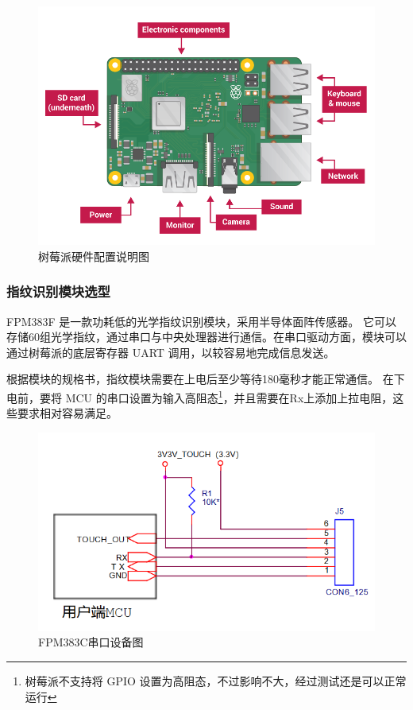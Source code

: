 \begin{figure}[ht]
    \centering
    \includegraphics[width=\textwidth]{imgs/树莓派硬件配置说明图.png}
    \caption{树莓派硬件配置说明图}    \label{树莓派硬件配置说明图}
\end{figure}

\subsubsection{指纹识别模块选型}

FPM383F 是一款功耗低的光学指纹识别模块，采用半导体面阵传感器。
它可以存储60组光学指纹，通过串口与中央处理器进行通信。在串口驱动方面，模块可以通过树莓派的底层寄存器 UART 调用，以较容易地完成信息发送。

根据模块的规格书，指纹模块需要在上电后至少等待180毫秒才能正常通信。
在下电前，要将 MCU 的串口设置为输入高阻态\footnote{树莓派不支持将 GPIO 设置为高阻态，不过影响不大，经过测试还是可以正常运行}，并且需要在Rx上添加上拉电阻，这些要求相对容易满足。

\begin{figure}[ht]
    \centering
    \includegraphics[scale=0.6]{imgs/FPM383C串口设备图.png}
    \caption{FPM383C串口设备图}    \label{FPM383C串口设备图}
\end{figure}


